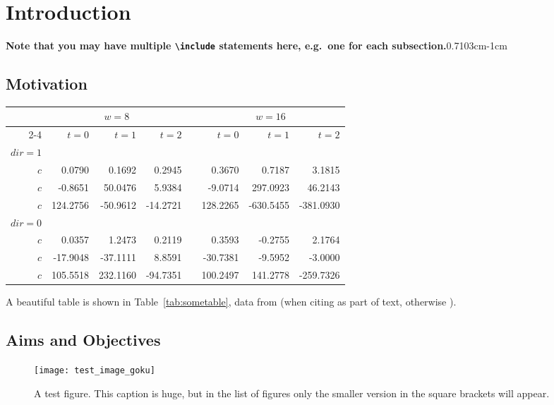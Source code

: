 \chapter{Introduction}

\textbf{Note that you may have multiple \texttt{{\textbackslash}include} statements here, e.g.\ one for each subsection.}{0.7}{1}{0}{3cm}{-1cm}

\section{Motivation} %
\blindtext

\begin{table*}\centering
{}
\begin{tabular}{@{}rrrrcrrr@{}}\toprule
& \multicolumn{3}{c}{$w = 8$} & \phantom{abc}& \multicolumn{3}{c}{$w = 16$} \\
\cmidrule{2-4} \cmidrule{6-8} 
& $t=0$ & $t=1$ & $t=2$ && $t=0$ & $t=1$ & $t=2$\\ \midrule
$dir=1$\\
$c$ & 0.0790 & 0.1692 & 0.2945 && 0.3670 & 0.7187 & 3.1815\\
$c$ & -0.8651& 50.0476& 5.9384&& -9.0714& 297.0923& 46.2143\\
$c$ & 124.2756& -50.9612& -14.2721&& 128.2265& -630.5455& -381.0930\\
$dir=0$\\
$c$ & 0.0357& 1.2473& 0.2119&& 0.3593& -0.2755& 2.1764\\
$c$ & -17.9048& -37.1111& 8.8591&& -30.7381& -9.5952& -3.0000\\
$c$ & 105.5518& 232.1160& -94.7351&& 100.2497& 141.2778& -259.7326\\
\bottomrule
\end{tabular}
\caption{A Beautiful and Complex Table}\label{tab:sometable}
\end{table*}

A beautiful table is shown in Table~\ref{tab:sometable}, data from \citet{Ebejer2012} (when citing as part of text, otherwise \citep{Ebejer2012}).

\section{Aims and Objectives} 
\blindtext

\begin{figure}[ht!] %
  \centering
  \texttt{[image: test\_image\_goku]}
  \caption[This is the short caption for List of Figures]{A test figure.  This caption is huge, but in the list of figures only the smaller version in the square brackets will appear.}
  \label{fig:test1}
\end{figure}

